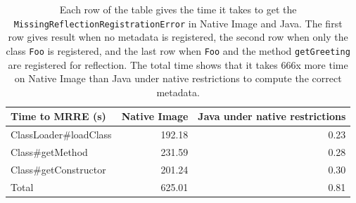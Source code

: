 \begin{table}[ht]
\centering
\begin{tabular}{@{}lrr@{}}
\toprule
Time to MRRE (s) & \multicolumn{1}{l}{Native Image} & \multicolumn{1}{l}{Java under native restrictions} \\ \midrule
ClassLoader\#loadClass          & 192.18 & 0.23 \\
Class\#getMethod                & 231.59 & 0.28 \\
Class\#getConstructor           & 201.24 & 0.30 \\ \midrule
Total                           & 625.01 & 0.81 \\ \bottomrule
\end{tabular}
\caption{Each row of the table gives the time it takes to get the \texttt{MissingReflectionRegistrationError} in Native Image and Java. The first row gives result when no metadata is registered, the second row when only the class \texttt{Foo} is registered, and the last row when \texttt{Foo} and the method \texttt{getGreeting} are registered for reflection. The total time shows that it takes 666x more time on Native Image than Java under native restrictions to compute the correct metadata.}
\label{tab:benchmark}
\end{table}


